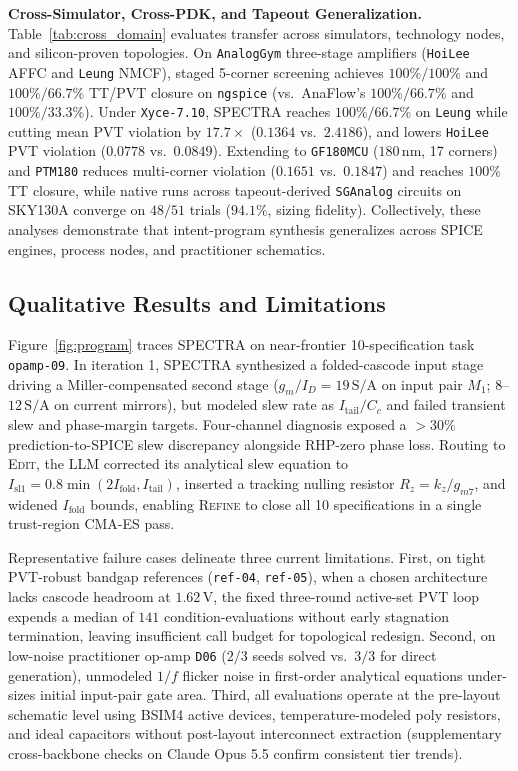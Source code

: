 \textbf{Cross-Simulator, Cross-PDK, and Tapeout Generalization.} Table~\ref{tab:cross_domain} evaluates transfer across simulators, technology nodes, and silicon-proven topologies. On \texttt{AnalogGym} three-stage amplifiers (\texttt{HoiLee} AFFC and \texttt{Leung} NMCF), staged 5-corner screening achieves $100\%/100\%$ and $100\%/66.7\%$ TT/PVT closure on \texttt{ngspice} (vs.\ AnaFlow's $100\%/66.7\%$ and $100\%/33.3\%$). Under \texttt{Xyce-7.10}, \textsc{SPECTRA} reaches $100\%/66.7\%$ on \texttt{Leung} while cutting mean PVT violation by $17.7\times$ ($0.1364$ vs.\ $2.4186$), and lowers \texttt{HoiLee} PVT violation ($0.0778$ vs.\ $0.0849$). Extending to \texttt{GF180MCU} ($180\,\mathrm{nm}$, 17 corners) and \texttt{PTM180} reduces multi-corner violation ($0.1651$ vs.\ $0.1847$) and reaches $100\%$ TT closure, while native runs across \SGAnalogTasks{} tapeout-derived \texttt{SGAnalog} circuits on SKY130A converge on $48/51$ trials ($94.1\%$, \SGAnalogFidelity{} sizing fidelity). Collectively, these analyses demonstrate that intent-program synthesis generalizes across SPICE engines, process nodes, and practitioner schematics.

\subsection{Qualitative Results and Limitations}
\label{sec:qualitative}
Figure~\ref{fig:program} traces \textsc{SPECTRA} on near-frontier 10-specification task \texttt{opamp-09}. In iteration 1, \textsc{SPECTRA} synthesized a folded-cascode input stage driving a Miller-compensated second stage ($g_m/I_D = 19\,\mathrm{S/A}$ on input pair $M_1$; $8$--$12\,\mathrm{S/A}$ on current mirrors), but modeled slew rate as $I_{\text{tail}}/C_c$ and failed transient slew and phase-margin targets. Four-channel diagnosis exposed a $>30\%$ prediction-to-SPICE slew discrepancy alongside RHP-zero phase loss. Routing to \textsc{Edit}, the LLM corrected its analytical slew equation to $I_{\text{sl1}} = 0.8\min(2 I_{\text{fold}}, I_{\text{tail}})$, inserted a tracking nulling resistor $R_z = k_z / g_{m7}$, and widened $I_{\text{fold}}$ bounds, enabling \textsc{Refine} to close all 10 specifications in a single trust-region CMA-ES pass.

Representative failure cases delineate three current limitations. First, on tight PVT-robust bandgap references (\texttt{ref-04}, \texttt{ref-05}), when a chosen architecture lacks cascode headroom at $1.62\,\mathrm{V}$, the fixed three-round active-set PVT loop expends a median of $141$ condition-evaluations without early stagnation termination, leaving insufficient call budget for topological redesign. Second, on low-noise practitioner op-amp \texttt{D06} ($2/3$ seeds solved vs.\ $3/3$ for direct generation), unmodeled $1/f$ flicker noise in first-order analytical equations under-sizes initial input-pair gate area. Third, all evaluations operate at the pre-layout schematic level using BSIM4 active devices, temperature-modeled poly resistors, and ideal capacitors without post-layout interconnect extraction (supplementary cross-backbone checks on Claude Opus 5.5 confirm consistent tier trends).
